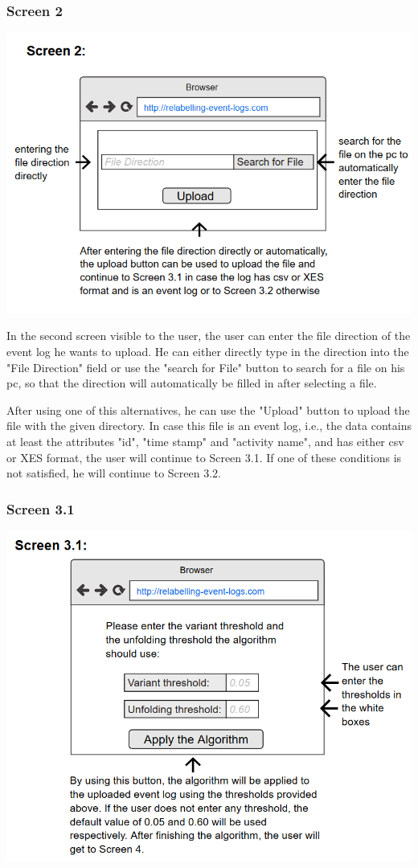 \documentclass[notitlepage]{article}
\begin{document}
\begin{flushleft}
\subsubsection{Screen 2}

\includegraphics[scale=0.8]{InterfaceMockup2.png}

In the second screen visible to the user, the user can enter the file direction of the event log he wants to upload. He can either directly type in the direction into the "File Direction" field or use the "search for File" button to search for a file on his pc, so that the direction will automatically be filled in after selecting a file.

After using one of this alternatives, he can use the "Upload" button to upload the file with the given directory. In case this file is an event log, i.e., the data contains at least the attributes "id", "time stamp" and "activity name", and has either csv or XES format, the user will continue to Screen 3.1. If one of these conditions is not satisfied, he will continue to Screen 3.2. 


\subsubsection{Screen 3.1}
\includegraphics[scale=0.8]{InterfaceMockup3-1.png}


\end{flushleft}
\end{document}
